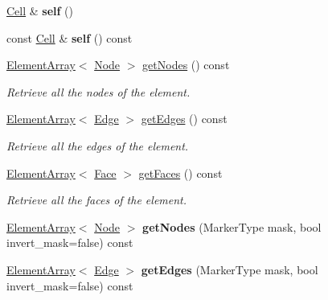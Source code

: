 \begin{DoxyCompactItemize}
\item 
\hypertarget{classINMOST_1_1Cell_ae7b259720c92912e8d267220f79e1ab5}{\hyperlink{classINMOST_1_1Cell}{Cell} \& {\bfseries self} ()}\label{classINMOST_1_1Cell_ae7b259720c92912e8d267220f79e1ab5}

\item 
\hypertarget{classINMOST_1_1Cell_ac283b04a07fdacfba61054cfc054f7bf}{const \hyperlink{classINMOST_1_1Cell}{Cell} \& {\bfseries self} () const }\label{classINMOST_1_1Cell_ac283b04a07fdacfba61054cfc054f7bf}

\item 
\hyperlink{classINMOST_1_1ElementArray}{Element\-Array}$<$ \hyperlink{classINMOST_1_1Node}{Node} $>$ \hyperlink{classINMOST_1_1Cell_acc265095375df199a083a344d56e4645}{get\-Nodes} () const 
\begin{DoxyCompactList}\small\item\em Retrieve all the nodes of the element. \end{DoxyCompactList}\item 
\hyperlink{classINMOST_1_1ElementArray}{Element\-Array}$<$ \hyperlink{classINMOST_1_1Edge}{Edge} $>$ \hyperlink{classINMOST_1_1Cell_ab0f9c4743826338a4df1b61b69b37c40}{get\-Edges} () const 
\begin{DoxyCompactList}\small\item\em Retrieve all the edges of the element. \end{DoxyCompactList}\item 
\hyperlink{classINMOST_1_1ElementArray}{Element\-Array}$<$ \hyperlink{classINMOST_1_1Face}{Face} $>$ \hyperlink{classINMOST_1_1Cell_a85ccc42adbb161a36a866fcea0f961d2}{get\-Faces} () const 
\begin{DoxyCompactList}\small\item\em Retrieve all the faces of the element. \end{DoxyCompactList}\item 
\hypertarget{classINMOST_1_1Cell_a3ad5728090b1780f5c4226e5f73756f9}{\hyperlink{classINMOST_1_1ElementArray}{Element\-Array}$<$ \hyperlink{classINMOST_1_1Node}{Node} $>$ {\bfseries get\-Nodes} (Marker\-Type mask, bool invert\-\_\-mask=false) const }\label{classINMOST_1_1Cell_a3ad5728090b1780f5c4226e5f73756f9}

\item 
\hypertarget{classINMOST_1_1Cell_a93e527e5b5006011c78b0cd541129660}{\hyperlink{classINMOST_1_1ElementArray}{Element\-Array}$<$ \hyperlink{classINMOST_1_1Edge}{Edge} $>$ {\bfseries get\-Edges} (Marker\-Type mask, bool invert\-\_\-mask=false) const }\label{classINMOST_1_1Cell_a93e527e5b5006011c78b0cd541129660}


\end{DoxyCompactItemize}
